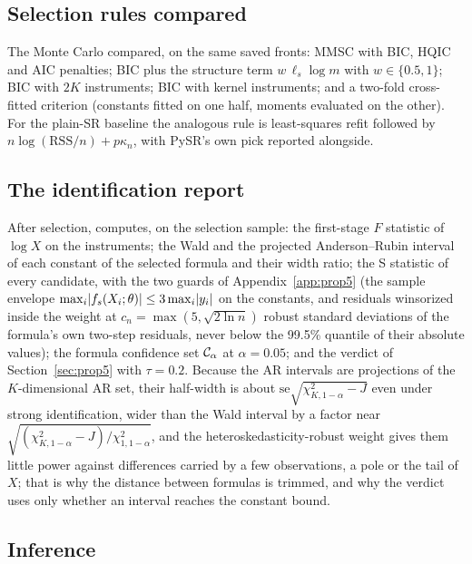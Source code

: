 \subsection{Selection rules compared}

The Monte Carlo compared, on the same saved fronts: MMSC with BIC, HQIC and AIC penalties; BIC plus the structure term $w\,\ell_s\log m$ with $w \in \{0.5, 1\}$; BIC with $2K$ instruments; BIC with kernel instruments; and a two-fold cross-fitted criterion (constants fitted on one half, moments evaluated on the other). For the plain-SR baseline the analogous rule is least-squares refit followed by $n\log(\mathrm{RSS}/n) + p\kappa_n$, with PySR's own pick reported alongside.

\subsection{The identification report}
\label{sec:impl-report}

After selection,  computes, on the selection sample: the first-stage $F$ statistic of $\log X$ on the instruments; the Wald and the projected Anderson--Rubin interval of each constant of the selected formula and their width ratio; the S statistic of every candidate, with the two guards of Appendix~\ref{app:prop5} (the sample envelope $\max_i\lvert f_s(X_i;\theta)\rvert \le 3\max_i\lvert y_i\rvert$ on the constants, and residuals winsorized inside the weight at $c_n = \max(5, \sqrt{2\ln n})$ robust standard deviations of the formula's own two-step residuals, never below the 99.5\% quantile of their absolute values); the formula confidence set $\mathcal{C}_\alpha$ at $\alpha = 0.05$; and the verdict of Section~\ref{sec:prop5} with $\tau = 0.2$. Because the AR intervals are projections of the $K$-dimensional AR set, their half-width is about $\mathrm{se}\sqrt{\chi^2_{K,1-\alpha} - J}$ even under strong identification, wider than the Wald interval by a factor near $\sqrt{(\chi^2_{K,1-\alpha} - J)/\chi^2_{1,1-\alpha}}$, and the heteroskedasticity-robust weight gives them little power against differences carried by a few observations, a pole or the tail of $X$; that is why the distance between formulas is trimmed, and why the verdict uses only whether an interval reaches the constant bound.

\subsection{Inference}

